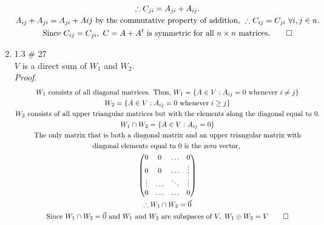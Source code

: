 \documentclass{article}
\begin{document}
\begin{enumerate}
\begin{gather*}
        \therefore C_{ji} = A_{ji} + A_{ij}. \\
        A_{ij} + A_{ji} = A_{ji} + A{ij} \textrm{ by the commutative property of addition, } \therefore C_{ij} = C_{ji} \ \forall i,j \in n. \\
        \textrm{Since } C_{ij} = C_{ji}, \ C = A + A^t \textrm{ is symmetric for all $n \times n $ matrices.} \qed
    \end{gather*}
    \item 1.3 \# 27 \\
    $V$ is a direct sum of $W_1$ and $W_2$. \\
    \textit{Proof.}
    \begin{gather*}
        W_1 \textrm{ consists of all diagonal matrices. Thus, } W_1 = \{A \in V: A_{ij} = 0 \textrm{ whenever } i \neq j\} \\
        W_2 = \{A \in V : A_{ij} = 0 \textrm{ whenever } i \geq j\} \\
        W_2 \textrm{ consists of all upper triangular matrices but with the elements along the diagonal equal to 0.} \\
        W_1 \cap W_2 = \{A \in V: A_{ij} = 0\} \\
        \textrm{The only matrix that is both a diagonal matrix and an upper triangular matrix with} \\
        \textrm{diagonal elements equal to 0 is the zero vector, } \\
        \begin{pmatrix}
            0 & 0 & \hdots & 0 \\
            0 & 0 & \hdots & \vdots \\
            \vdots & \hdots & \ddots & \vdots \\
            0 & \hdots & \hdots & 0 \\
        \end{pmatrix} \\
        \therefore W_1 \cap W_2 = \vec 0 \\
        \textrm{Since } W_1 \cap W_2 = \vec 0 \textrm{ and } W_1 \textrm{ and } W_2 \textrm{ are subspaces of } V, \ W_1 \oplus W_2 = V \qed
    \end{gather*}
\end{enumerate}
\end{document}
